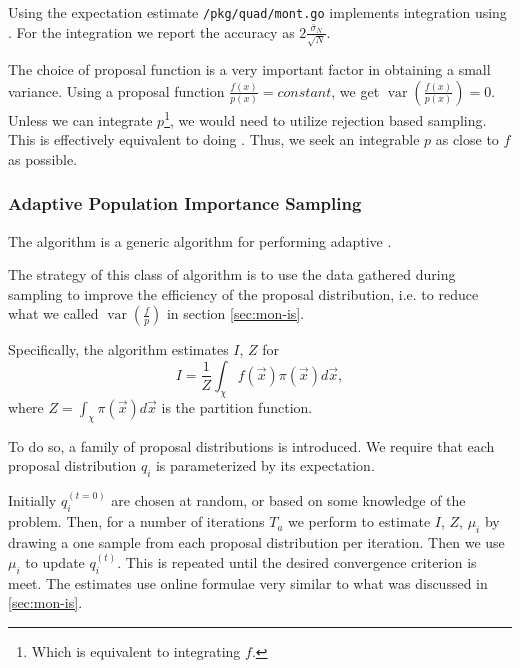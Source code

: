 \documentclass[10pt, a4paper]{article}
\begin{document}
  Using the expectation estimate \texttt{/pkg/quad/mont.go} implements integration using \is{}. For
  the \is{} integration we report the accuracy as $2\frac{\bar\sigma_N}{\sqrt N}$.

  The choice of proposal function is a very important factor in
  obtaining a small variance. Using a proposal function $\frac{f(x)}{p(x)} = constant$, we get
  $\operatorname{var}\left(\frac{f(x)}{p(x)}\right) = 0$. Unless we can integrate $p$\footnote{Which is
  equivalent to integrating $f$.}, we would need to utilize rejection based sampling. This is effectively
  equivalent to doing \is. Thus, we seek an integrable $p$ as close to $f$ as possible.

  \subsubsection{Adaptive Population Importance Sampling}
  The \apis{} algorithm is a generic algorithm for performing adaptive \is{}.

  The strategy of this class of algorithm is to use the data gathered during sampling to improve
  the efficiency of the proposal distribution, i.e. to reduce what we called
  $\operatorname{var}\left(\frac fp\right)$ in section \ref{sec:mon-is}.

  Specifically, the \apis{} algorithm estimates $I$, $Z$ for
  \begin{equation}
  I = \frac{1}{Z} \int_\chi f(\vec{x}) \pi(\vec{x}) d\vec{x},
  \end{equation}
  where $Z = \int_\chi \pi(\vec{x}) d\vec{x}$ is the partition function.

  To do so, a family of proposal distributions is introduced. We require that each proposal distribution
  $q_i$ is parameterized by its expectation\cite{apis}\footnotemark.


  Initially $q_i^{(t=0)}$ are chosen at random, or based on some knowledge of the problem. Then, for a number
  of iterations $T_a$ we perform \is{} to estimate $I$, $Z$, $\mu_i$ by drawing a one sample from each
  proposal distribution per iteration. Then we use $\mu_i$ to update $q_i^{(t)}$. This is repeated
  until the desired convergence criterion is meet. The estimates use online formulae very similar
  to what was discussed in \ref{sec:mon-is}.
\end{document}
